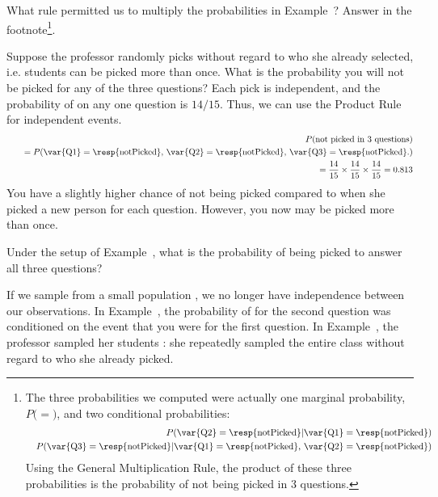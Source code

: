 \begin{exercise}
What rule permitted us to multiply the probabilities in Example~? Answer in the footnote\footnote{The three probabilities we computed were actually one marginal probability, $P($$ = $$)$, and two conditional probabilities:
\begin{eqnarray*}
&&P(\text{\var{Q2}} =  \text{\resp{notPicked}}|\text{\var{Q1}} = \text{\resp{notPicked}}) \\
&&P(\text{\var{Q3}} =  \text{\resp{notPicked}}|\text{\var{Q1}} = \text{\resp{notPicked}, }\text{\var{Q2}} = \text{\resp{notPicked}})
\end{eqnarray*}
Using the General Multiplication Rule, the product of these three probabilities is the probability of not being picked in 3 questions.}.
\end{exercise}

\begin{example}{Suppose the professor randomly picks without regard to who she already selected, i.e. students can be picked more than once. What is the probability you will not be picked for any of the three questions?}\label{3wRep}
Each pick is independent, and the probability of  on any one question is $14/15$. Thus, we can use the Product Rule for independent events.
\begin{eqnarray*}
&&P(\text{not picked in 3 questions}) \\
&&\quad = P(\text{\var{Q1}} = \text{\resp{notPicked}, }\text{\var{Q2}} = \text{\resp{notPicked}, }\text{\var{Q3}} = \text{\resp{notPicked}.}) \\
&&\quad = \frac{14}{15}\times\frac{14}{15}\times\frac{14}{15} = 0.813
\end{eqnarray*}
You have a slightly higher chance of not being picked compared to when she picked a new person for each question. However, you now may be picked more than once.
\end{example}

\begin{exercise}
Under the setup of Example~, what is the probability of being picked to answer all three questions?
\end{exercise}

If we sample from a small population , we no longer have independence between our observations. In Example~, the probability of  for the second question was conditioned on the event that you were  for the first question. In Example~, the professor sampled her students : she repeatedly sampled the entire class without regard to who she already picked. 

